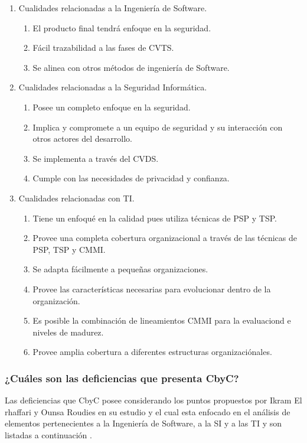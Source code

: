 \documentclass[runningheads,a4paper]{llncs}
\begin{document}
\begin{enumerate}
	\item Cualidades relacionadas a la Ingeniería de \gls{Software}.
		\begin{enumerate}
			\item El producto final tendrá enfoque en la seguridad.
			\item Fácil trazabilidad a las fases de \gls{CVTS}.
			\item Se alinea con otros métodos de ingeniería de \gls{Software}.\\
			
		\end{enumerate}
	\item Cualidades relacionadas a la Seguridad Informática.
		\begin{enumerate}
			\item Posee un completo enfoque en la seguridad.
			\item Implica y compromete a un equipo de seguridad y su interacción con otros actores del desarrollo.
			\item Se implementa a través del \gls{CVDS}.
			\item Cumple con las necesidades de privacidad y confianza.\\

		\end{enumerate}
	\item Cualidades relacionadas con \gls{TI}.
		\begin{enumerate}
			\item Tiene un enfoqué en la calidad pues utiliza técnicas de \gls{PSP} y \gls{TSP}. 
			\item Provee una completa cobertura organizacional a través de las técnicas de \gls{PSP}, \gls{TSP} y \gls{CMMI}.
			\item Se adapta fácilmente a pequeñas organizaciones.
			\item Provee las características necesarias para evolucionar dentro de la organización.
			\item Es posible la combinación de lineamientos \gls{CMMI} para la evaluaciond e niveles de madurez.
			\item Provee amplia cobertura a diferentes estructuras organizaciónales.
		\end{enumerate}
\end{enumerate}
     
\subsubsection{¿Cuáles son las deficiencias que presenta \gls{CbyC}?}
Las deficiencias que \gls{CbyC} posee considerando los puntos propuestos por Ikram El rhaffari y Ounsa Roudies en su estudio y el cual esta enfocado en el análisis de elementos pertenecientes a la Ingeniería de \gls{Software}, a la \gls{SI} y a las \gls{TI} y son listadas a continuación \cite{BenchmarkingSDLCLAPS}.
\end{document}
